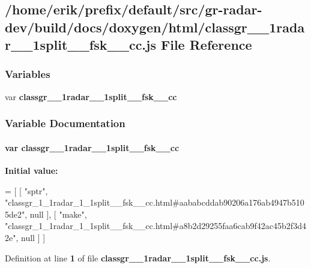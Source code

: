 \subsection{/home/erik/prefix/default/src/gr-\/radar-\/dev/build/docs/doxygen/html/classgr\+\_\+\_\+1radar\+\_\+\_\+1split\+\_\+\+\_\+fsk\+\_\+\+\_\+cc.js File Reference}
\label{classgr__1__1radar__1__1split____fsk____cc_8js}
\subsubsection*{Variables}
\begin{DoxyCompactItemize}
\item 
var {\bf classgr\+\_\+\_\+1radar\+\_\+\_\+1split\+\_\+\+\_\+fsk\+\_\+\+\_\+cc}
\end{DoxyCompactItemize}


\subsubsection{Variable Documentation}
\paragraph[{classgr\+\_\+1\+\_\+1radar\+\_\+1\+\_\+1split\+\_\+\+\_\+fsk\+\_\+\+\_\+cc}]{\setlength{\rightskip}{0pt plus 5cm}var classgr\+\_\+\_\+1radar\+\_\+\_\+1split\+\_\+\+\_\+fsk\+\_\+\+\_\+cc}\label{classgr__1__1radar__1__1split____fsk____cc_8js_a118a491d42957cf1a6f6c71c7e7e2c8e}
{\bfseries Initial value\+:}
\begin{DoxyCode}
=
[
    [ \textcolor{stringliteral}{"sptr"}, \textcolor{stringliteral}{"classgr\_1\_1radar\_1\_1split\_\_fsk\_\_cc.html#aababcddab90206a176ab4947b5105de2"}, null ],
    [ \textcolor{stringliteral}{"make"}, \textcolor{stringliteral}{"classgr\_1\_1radar\_1\_1split\_\_fsk\_\_cc.html#a8b2d29255faa6cab9f42ac45b2f3d42e"}, null ]
]
\end{DoxyCode}


Definition at line {\bf 1} of file {\bf classgr\+\_\+\_\+1radar\+\_\+\_\+1split\+\_\+\+\_\+fsk\+\_\+\+\_\+cc.\+js}.

